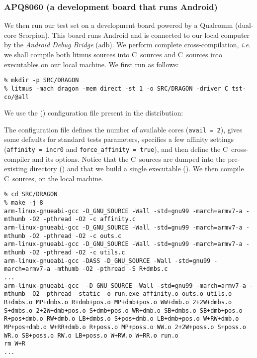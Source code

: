 \subsubsection{\label{driverc:example}APQ8060 (a development board that runs Android)}
We then run our test set on a development board
powered by a Qualcomm  (dual-core Scorpion).
This board runs Android and is connected to our local computer
by the \emph{Android Debug Bridge} (adb).
We perform complete cross-compilation, \emph{i.e.} we shall compile
both litmus sources into C~sources and C~sources into executables
on our local machine. We first run  as follows:
\begin{verbatim}
% mkdir -p SRC/DRAGON
% litmus -mach dragon -mem direct -st 1 -o SRC/DRAGON -driver C tst-co/@all
\end{verbatim}
We use the  () configuration file present
in the  distribution:

The configuration file defines the number of available cores
(\verb+avail = 2+),
gives some defaults for standard tests parameters,
specifies a few affinity settings
(\verb+affinity = incr0+ and \verb+force_affinity = true+), and then
define the C~cross-compiler and its options.
Notice that the C~sources are dumped into the pre-existing
directory () and that we build a single executable
().
We then compile C~sources, on the local machine.
\begin{verbatim}
% cd SRC/DRAGON
% make -j 8
arm-linux-gnueabi-gcc -D_GNU_SOURCE -Wall -std=gnu99 -march=armv7-a -mthumb -O2 -pthread -O2 -c affinity.c
arm-linux-gnueabi-gcc -D_GNU_SOURCE -Wall -std=gnu99 -march=armv7-a -mthumb -O2 -pthread -O2 -c outs.c
arm-linux-gnueabi-gcc -D_GNU_SOURCE -Wall -std=gnu99 -march=armv7-a -mthumb -O2 -pthread -O2 -c utils.c
arm-linux-gnueabi-gcc -DASS -D_GNU_SOURCE -Wall -std=gnu99 -march=armv7-a -mthumb -O2 -pthread -S R+dmbs.c
...
arm-linux-gnueabi-gcc  -D_GNU_SOURCE -Wall -std=gnu99 -march=armv7-a -mthumb -O2 -pthread -static -o run.exe affinity.o outs.o utils.o R+dmbs.o MP+dmbs.o R+dmb+pos.o MP+dmb+pos.o WW+dmb.o 2+2W+dmbs.o S+dmbs.o 2+2W+dmb+pos.o S+dmb+pos.o WR+dmb.o SB+dmbs.o SB+dmb+pos.o R+pos+dmb.o RW+dmb.o LB+dmbs.o S+pos+dmb.o LB+dmb+pos.o W+RW+dmb.o MP+pos+dmb.o W+RR+dmb.o R+poss.o MP+poss.o WW.o 2+2W+poss.o S+poss.o WR.o SB+poss.o RW.o LB+poss.o W+RW.o W+RR.o run.o
rm W+R
...
\end{verbatim}




